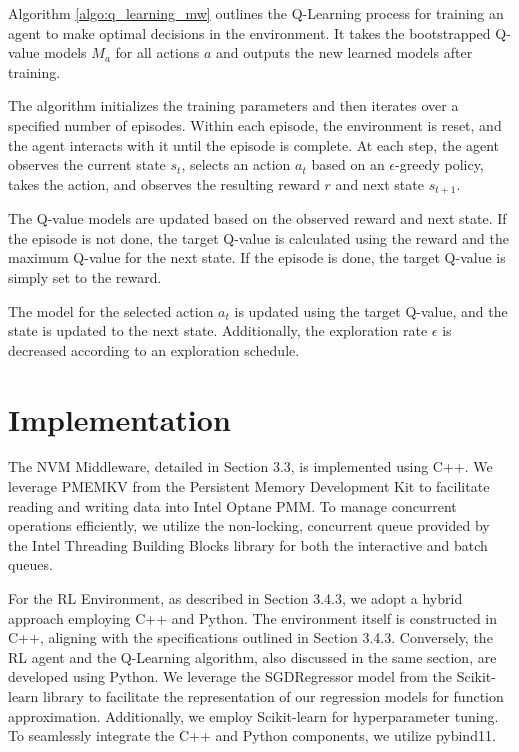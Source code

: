 Algorithm \ref{algo:q_learning_mw} outlines the Q-Learning process for training an agent to make optimal decisions in the environment. It takes the bootstrapped Q-value models $M_a$ for all actions $a$ and outputs the new learned models after training.

The algorithm initializes the training parameters and then iterates over a specified number of episodes. Within each episode, the environment is reset, and the agent interacts with it until the episode is complete. At each step, the agent observes the current state $s_t$, selects an action $a_t$ based on an $\epsilon$-greedy policy, takes the action, and observes the resulting reward $r$ and next state $s_{t+1}$.

The Q-value models are updated based on the observed reward and next state. If the episode is not done, the target Q-value is calculated using the reward and the maximum Q-value for the next state. If the episode is done, the target Q-value is simply set to the reward.

The model for the selected action $a_t$ is updated using the target Q-value, and the state is updated to the next state. Additionally, the exploration rate $\epsilon$ is decreased according to an exploration schedule.

\section{Implementation}

The NVM Middleware, detailed in Section 3.3, is implemented using C++. We leverage PMEMKV from the Persistent Memory Development Kit \cite{scargall2020pmem} to facilitate reading and writing data into Intel Optane PMM. To manage concurrent operations efficiently, we utilize the non-locking, concurrent queue provided by the Intel Threading Building Blocks \cite{tbb:online} library for both the interactive and batch queues.

For the RL Environment, as described in Section 3.4.3, we adopt a hybrid approach employing C++ and Python. The environment itself is constructed in C++, aligning with the specifications outlined in Section 3.4.3. Conversely, the RL agent and the Q-Learning algorithm, also discussed in the same section, are developed using Python. We leverage the SGDRegressor model from the Scikit-learn\cite{scikitle61:online} library to facilitate the representation of our regression models for function approximation. Additionally, we employ Scikit-learn for hyperparameter tuning. To seamlessly integrate the C++ and Python components, we utilize pybind11\cite{pybind1111:online}.